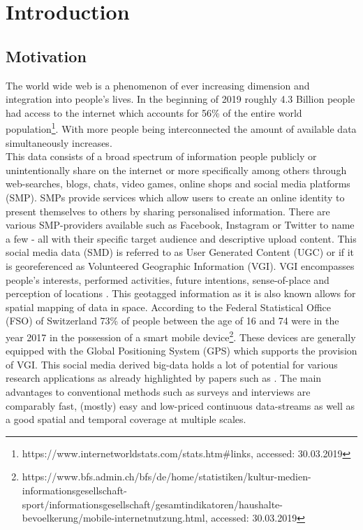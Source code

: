 \chapter{Introduction}
\section{Motivation}
The world wide web is a phenomenon of ever increasing dimension and integration into people's lives. In the beginning of 2019 roughly 4.3 Billion people had access to the internet which accounts for 56\% of the entire world population\footnote{https://www.internetworldstats.com/stats.htm\#links, accessed: 30.03.2019}. 
With more people being interconnected the amount of available data simultaneously increases. \\
This data consists of a broad spectrum of information people publicly or unintentionally share on the internet or more specifically among others through web-searches, blogs, chats, video games, online shops and social media platforms (SMP). SMPs provide services which allow users to create an online identity to present themselves to others by sharing personalised information. There are various SMP-providers available such as Facebook, Instagram or Twitter to name a few - all with their specific target audience and descriptive upload content. This social media data (SMD) is referred to as User Generated Content (UGC) or if it is georeferenced as Volunteered Geographic Information (VGI). VGI encompasses people's interests, performed activities, future intentions, sense-of-place and perception of locations \parencite{Goodchild2007}. This geotagged information as it is also known allows for spatial mapping of data in space.  
According to the Federal Statistical Office (FSO) of Switzerland 73\% of people between the age of 16 and 74 were in the year 2017 in the possession of a smart mobile device\footnote{https://www.bfs.admin.ch/bfs/de/home/statistiken/kultur-medien-informationsgesellschaft-sport/informationsgesellschaft/gesamtindikatoren/haushalte-bevoelkerung/mobile-internetnutzung.html, accessed: 30.03.2019}. These devices are generally equipped with the Global Positioning System (GPS) which supports the provision of VGI.
This social media derived big-data holds a lot of potential for various research applications as already highlighted by papers such as \textcite{DiMinin2015, DiMinin2017, Meentemeyer2016}. The main advantages to conventional methods such as surveys and interviews are comparably fast, (mostly) easy and low-priced continuous data-streams as well as a good spatial and temporal coverage at multiple scales.\\
